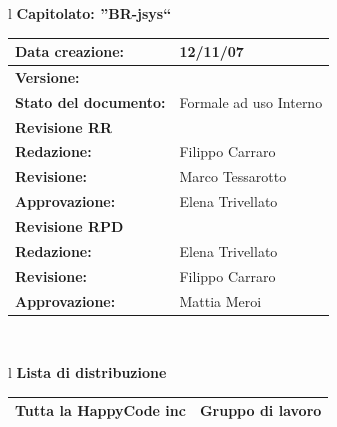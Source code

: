 \documentclass[11pt,titlepage,a4paper]{report}
\begin{document}
\begin{center}
\thispagestyle{plain}
\begin{table}[htbp]
\large{
\begin{tabular}{l}
\Large{\textbf{\textsf{Capitolato: ''BR-jsys``}}} \\
\begin{tabular}{||p{6cm}||p{6cm}||}
\hline
\textbf{Data creazione:} & 12/11/07 \\
\hline
\textbf{Versione:} & \lv \\ \hline
\textbf{Stato del documento:} & Formale ad uso Interno \\ \hline
\textbf{Revisione RR} &      \\ \hline
\textbf{Redazione:} & Filippo Carraro \\ \hline
\textbf{Revisione:} & Marco Tessarotto \\ \hline
\textbf{Approvazione:}  & Elena Trivellato\\ \hline
\textbf{Revisione RPD} & \\ \hline
\textbf{Redazione:} & Elena Trivellato \\ \hline
\textbf{Revisione:} & Filippo Carraro \\ \hline
\textbf{Approvazione:} & Mattia Meroi \\ \hline
\end{tabular} \\
\end{tabular}
}
\end{table}

\begin{table}[hbtp]
\large{
\begin{tabular}{l}
\Large{\textbf{\textsf{Lista di distribuzione}}} \\
\begin{tabular}{||p{6cm}||p{6cm}||} \hline
{Tutta la HappyCode inc}& Gruppo di lavoro \\ \hline
\end{tabular} \\
\end{tabular}
}
\end{table}


\end{center}
\end{document}

